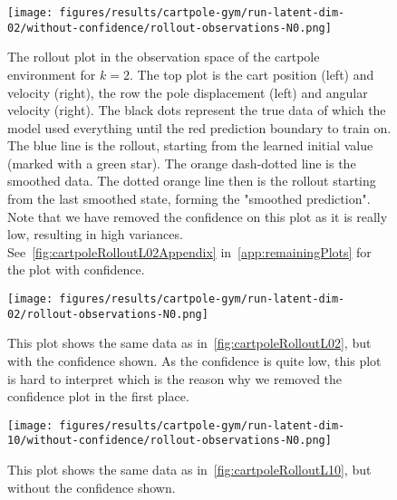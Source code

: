 		\begin{figure}
			\centering
			\texttt{[image: figures/results/cartpole-gym/run-latent-dim-02/without-confidence/rollout-observations-N0.png]}
			\caption[Rollout of the cartpole experiment for 2 latent dimensions without confidence]{The rollout plot in the observation space of the cartpole environment for \(k = 2\). The top plot is the cart position (left) and velocity (right), the row the pole displacement (left) and angular velocity (right). The black dots represent the true data of which the model used everything until the red prediction boundary to train on. The blue line is the rollout, starting from the learned initial value (marked with a green star). The orange dash-dotted line is the smoothed data. The dotted orange line then is the rollout starting from the last smoothed state, forming the "smoothed prediction". Note that we have removed the confidence on this plot as it is really low, resulting in high variances. See~\autoref{fig:cartpoleRolloutL02Appendix} in~\autoref{app:remainingPlots} for the plot with confidence.}
			\label{fig:cartpoleRolloutL02}
		\end{figure}
		\begin{figure}
			\centering
			\texttt{[image: figures/results/cartpole-gym/run-latent-dim-02/rollout-observations-N0.png]}
			\caption[Rollout of the cartpole experiment for 2 latent dimensions with confidence]{This plot shows the same data as in~\autoref{fig:cartpoleRolloutL02}, but with the confidence shown. As the confidence is quite low, this plot is hard to interpret which is the reason why we removed the confidence plot in the first place.}
			\label{fig:cartpoleRolloutL02Appendix}
		\end{figure}

		\begin{figure}
			\centering
			\texttt{[image: figures/results/cartpole-gym/run-latent-dim-10/without-confidence/rollout-observations-N0.png]}
			\caption[Rollout of the cartpole experiment for 10 latent dimensions without confidence]{This plot shows the same data as in~\autoref{fig:cartpoleRolloutL10}, but without the confidence shown.}
			\label{fig:cartpoleRolloutL10Appendix}
		\end{figure}


